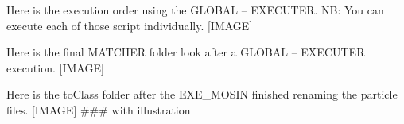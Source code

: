 Here is the execution order using the GLOBAL – EXECUTER.
NB: You can execute each of those script individually.
[IMAGE]

Here is the final MATCHER folder look after a GLOBAL – EXECUTER execution.
[IMAGE]

Here is the toClass folder after the EXE_MOSIN finished renaming the particle files.
[IMAGE]
### with illustration
    
    
    
    
    
    
    
    
    
    
    
    
    